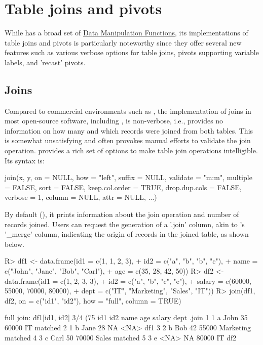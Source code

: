 \documentclass[article]{jss}
\begin{document}
\section{Table joins and pivots} \label{sec:join_pivot}
%
While  has a broad set of \href{https://sebkrantz.github.io/collapse/reference/fast-data-manipulation.html}{Data Manipulation Functions}, its implementations of table joins and pivots is particularly noteworthy since they offer several new features such as various verbose options for table joins, pivots supporting variable labels, and 'recast' pivots.
%
\subsection{Joins}
%
Compared to commercial environments such as , the implementation of joins in most open-source software, including , is non-verbose, i.e., provides no information on how many and which records were joined from both tables. This is somewhat unsatisfying and often provokes manual efforts to validate the join operation.  provides a rich set of options to make table join operations intelligible. Its syntax is:
\begin{Code}
join(x, y, on = NULL, how = "left", suffix = NULL, validate = "m:m",
     multiple = FALSE, sort = FALSE, keep.col.order = TRUE,
     drop.dup.cols = FALSE, verbose = 1, column = NULL, attr = NULL, ...)
\end{Code}
By default (), it prints information about the join operation and number of records joined. Users can request the generation of a '.join' column, akin to 's '\_merge' column, indicating the origin of records in the joined table, as shown below.
%
\begin{Schunk}
\begin{Sinput}
R> df1 <- data.frame(id1 = c(1, 1, 2, 3),
+                    id2 = c("a", "b", "b", "c"),
+                    name = c("John", "Jane", "Bob", "Carl"),
+                    age = c(35, 28, 42, 50))
R> df2 <- data.frame(id1 = c(1, 2, 3, 3),
+                    id2 = c("a", "b", "c", "e"),
+                    salary = c(60000, 55000, 70000, 80000),
+                    dept = c("IT", "Marketing", "Sales", "IT"))
R> join(df1, df2, on = c("id1", "id2"), how = "full", column = TRUE)
\end{Sinput}
\begin{Soutput}
full join: df1[id1, id2] 3/4 (75%) <m:m> df2[id1, id2] 3/4 (75%)
  id1 id2 name age salary      dept   .join
1   1   a John  35  60000        IT matched
2   1   b Jane  28     NA      <NA>     df1
3   2   b  Bob  42  55000 Marketing matched
4   3   c Carl  50  70000     Sales matched
5   3   e <NA>  NA  80000        IT     df2
\end{Soutput}
\end{Schunk}
\end{document}

